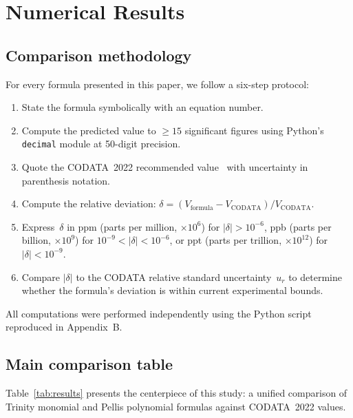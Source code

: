 \documentclass[11pt,a4paper]{article}
\newcommand{\CODATA}{\text{CODATA}}
\begin{document}
\section{Numerical Results}\label{sec:results}

\subsection{Comparison methodology}\label{sec:method}

For every formula presented in this paper, we follow a six-step protocol:
\begin{enumerate}
\item State the formula symbolically with an equation number.
\item Compute the predicted value to $\geq 15$ significant figures using
  Python's \texttt{decimal} module at 50-digit precision.
\item Quote the CODATA~2022 recommended value~\cite{codata2022} with
  uncertainty in parenthesis notation.
\item Compute the relative deviation:
  $\delta = (V_{\mathrm{formula}} - V_{\CODATA}) / V_{\CODATA}$.
\item Express~$\delta$ in ppm (parts per million, $\times 10^{6}$) for
  $|\delta|>10^{-6}$, ppb (parts per billion, $\times 10^{9}$) for
  $10^{-9}<|\delta|<10^{-6}$, or ppt (parts per trillion, $\times 10^{12}$)
  for $|\delta|<10^{-9}$.
\item Compare $|\delta|$ to the CODATA relative standard uncertainty~$u_r$ to
  determine whether the formula's deviation is within current experimental
  bounds.
\end{enumerate}

All computations were performed independently using the Python script
reproduced in Appendix~B.

\subsection{Main comparison table}\label{sec:maintable}

Table~\ref{tab:results} presents the centerpiece of this study: a unified
comparison of Trinity monomial and Pellis polynomial formulas against
CODATA~2022 values.
\end{document}
